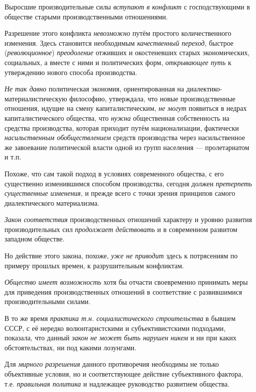 \documentclass[a4paper,14pt,russian]{extreport}
\begin{document}
Выросшие производительные силы \emph{вступают в конфликт} с господствующими в обществе старыми производственными отношениями.

Разрешение этого конфликта \emph{невозможно} путём простого количественного изменения. Здесь становится необходимым \emph{качественный переход}, быстрое (\emph{революционное}) \emph{преодоление} отживших и окостеневших старых экономических, социальных, а вместе с ними и политических форм, \emph{открывающее путь} к утверждению нового способа производства.

\emph{Не так давно} политическая экономия, ориентированная на диалектико-материалистическую философию, утверждала, что новые производственные отношения, идущие на смену капиталистическим, \emph{не могут} появиться в недрах капиталистического общества, что \emph{нужна} общественная собственность на средства производства, которая приходит путём национализации, фактически \emph{насильственным обобществлением} средств производства через насильственное же завоевание политической власти одной из групп населения --- пролетариатом и т.п.

Похоже, что сам такой подход в условиях современного общества, с его существенно изменившимся способом производства, сегодня должен \emph{претерпеть существенные изменения}, и прежде всего с точки зрения принципов самого диалектического материализма.

\emph{Закон соответствия} производственных отношений характеру и уровню развития производительных сил \emph{продолжает действовать} и в современном развитом западном обществе.

Но действие этого закона, похоже, \emph{уже не приводит} здесь к потрясениям по примеру прошлых времен, к разрушительным конфликтам.

\emph{Общество имеет возможность} хотя бы отчасти своевременно принимать меры для приведения производственных отношений в соответствие с развившимися производительными силами.

В то же время \emph{практика т.н. социалистического строительства} в бывшем СССР, с её нередко волюнтаристскими и субъективистскими подходами, показала, что данный \emph{закон не может быть нарушен никем} и ни при каких обстоятельствах, ни под какими лозунгами.

Для \emph{мирного разрешения} данного противоречия необходимы не только объективные условия, но и соответствующее действие субъективного фактора, т.е. \emph{правильная политика} и надлежащее руководство развитием общества.
\end{document}
